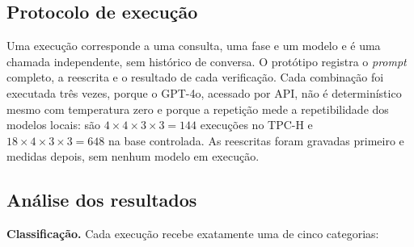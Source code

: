 \documentclass[12pt]{article}
\begin{document}
\subsection{Protocolo de execução}
\label{sec:protocolo}

Uma execução corresponde a uma consulta, uma fase e um modelo e é uma chamada independente, sem histórico de conversa. O protótipo registra o \textit{prompt} completo, a reescrita e o resultado de cada verificação. Cada combinação foi executada três vezes, porque o GPT-4o, acessado por API, não é determinístico mesmo com temperatura zero e porque a repetição mede a repetibilidade dos modelos locais: são $4 \times 4 \times 3 \times 3 = 144$ execuções no TPC-H e $18 \times 4 \times 3 \times 3 = 648$ na base controlada. As reescritas foram gravadas primeiro e medidas depois, sem nenhum modelo em execução.

\subsection{Análise dos resultados}
\label{sec:analise}

\textbf{Classificação.} Cada execução recebe exatamente uma de cinco categorias:
\end{document}
